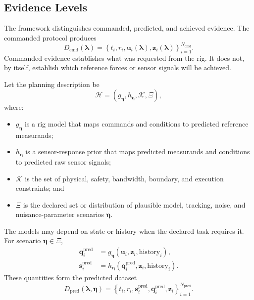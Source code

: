 \documentclass[11pt,a4paper]{article}
\begin{document}
\subsection{Evidence Levels}

The framework distinguishes commanded, predicted, and achieved evidence. The
commanded protocol produces
\begin{equation}
    D_{\mathrm{cmd}}
    \left(
        \boldsymbol{\lambda}
    \right)
    =
    \left\{
        t_i,
        r_i,
        \mathbf{u}_i
        \left(
            \boldsymbol{\lambda}
        \right),
        \mathbf{z}_i
        \left(
            \boldsymbol{\lambda}
        \right)
    \right\}_{i=1}^{N_{\mathrm{cmd}}}.
\end{equation}
Commanded evidence establishes what was requested from the rig. It does not,
by itself, establish which reference forces or sensor signals will be
achieved.

Let the planning description be
\begin{equation}
    \mathcal{H}
    =
    \left(
        g_{\boldsymbol{\eta}},
        h_{\boldsymbol{\eta}},
        \mathcal{K},
        \Xi
    \right),
\end{equation}
where:
\begin{itemize}
    \item $g_{\boldsymbol{\eta}}$ is a rig model that maps commands and
        conditions to predicted reference measurands;
    \item $h_{\boldsymbol{\eta}}$ is a sensor-response prior that maps
        predicted measurands and conditions to predicted raw sensor signals;
    \item $\mathcal{K}$ is the set of physical, safety, bandwidth, boundary,
        and execution constraints; and
    \item $\Xi$ is the declared set or distribution of plausible model,
        tracking, noise, and nuisance-parameter scenarios
        $\boldsymbol{\eta}$.
\end{itemize}
The models may depend on state or history when the declared task requires it.
For scenario $\boldsymbol{\eta}\in\Xi$,
\begin{align}
    \mathbf{q}^{\mathrm{pred}}_i
    &=
    g_{\boldsymbol{\eta}}
    \left(
        \mathbf{u}_i,
        \mathbf{z}_i,
        \text{history}_i
    \right),\\
    \mathbf{s}^{\mathrm{pred}}_i
    &=
    h_{\boldsymbol{\eta}}
    \left(
        \mathbf{q}^{\mathrm{pred}}_i,
        \mathbf{z}_i,
        \text{history}_i
    \right).
\end{align}
These quantities form the predicted dataset
\begin{equation}
    D_{\mathrm{pred}}
    \left(
        \boldsymbol{\lambda},
        \boldsymbol{\eta}
    \right)
    =
    \left\{
        t_i,
        r_i,
        \mathbf{s}^{\mathrm{pred}}_i,
        \mathbf{q}^{\mathrm{pred}}_i,
        \mathbf{z}_i
    \right\}_{i=1}^{N_{\mathrm{pred}}}.
\end{equation}
\end{document}
